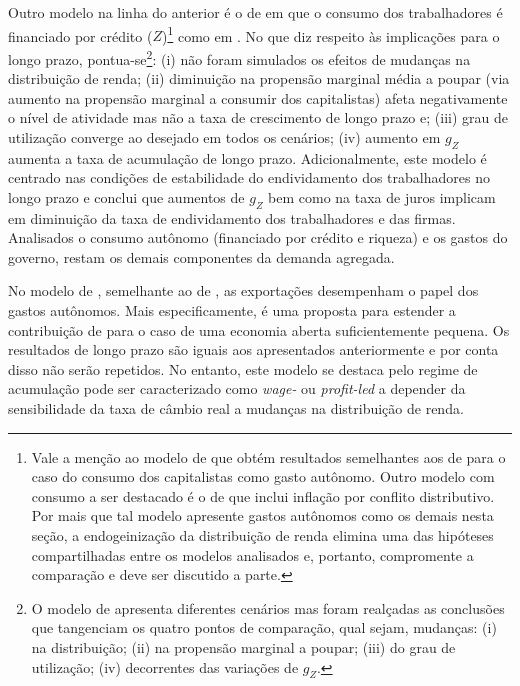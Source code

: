 Outro modelo na linha do anterior é o de \textcite{mandarino_financing_2018} em que o consumo dos trabalhadores é financiado por crédito ($Z$)\footnote{%
Vale a menção ao modelo de \textcite{lavoie_convergence_2016} que obtém resultados semelhantes aos de \textcite{allain_macroeconomic_2014} para o caso do consumo dos capitalistas como gasto autônomo. Outro modelo com consumo a ser destacado é o de \textcite{nah_role_2019} %
que inclui inflação por conflito distributivo. Por mais que tal modelo apresente gastos autônomos como os demais nesta seção, a endogeinização da distribuição de renda elimina uma das hipóteses compartilhadas entre os modelos analisados e, portanto, compromente a comparação e deve ser discutido a parte.} como em \textcite{fagundes_dinamica_2017}. No que diz respeito às implicações para o longo prazo, pontua-se\footnote{O modelo de \textcite{mandarino_financing_2018} apresenta diferentes cenários mas foram realçadas as conclusões que tangenciam os quatro pontos de comparação, qual sejam, mudanças: (i) na distribuição; (ii) na propensão marginal a poupar; (iii) do grau de utilização; (iv) decorrentes das variações de $g_Z$.}: (i) não foram simulados os efeitos de mudanças na distribuição de renda; (ii) diminuição na propensão marginal média a poupar (via aumento na propensão marginal a consumir dos capitalistas) afeta negativamente o nível de atividade mas não a taxa de crescimento de longo prazo e; (iii) grau de utilização converge ao desejado em todos os cenários; (iv) aumento em $g_Z$ aumenta a taxa de acumulação de longo prazo. Adicionalmente, este modelo é centrado nas condições de estabilidade do endividamento dos trabalhadores no longo prazo e conclui que aumentos de $g_Z$ bem como na taxa de juros implicam em diminuição da taxa de endividamento dos trabalhadores e das firmas. Analisados o consumo autônomo (financiado por crédito e riqueza) e os gastos do governo, restam os demais componentes da demanda agregada.



No modelo de \textcite{nah_long-run_2017}, semelhante ao de \textcite{dejuan_hidden_2017}, as exportações desempenham o papel dos gastos autônomos. Mais especificamente, é uma proposta para estender a contribuição de \textcite{serrano_sraffian_1995} para o caso de uma economia aberta suficientemente pequena. Os resultados de longo prazo são iguais aos apresentados anteriormente e por conta disso não serão repetidos. No entanto, este modelo se destaca pelo regime de acumulação pode ser caracterizado como \textit{wage-} ou \textit{profit-led} a depender da sensibilidade da taxa de câmbio real a mudanças na distribuição de renda. 

